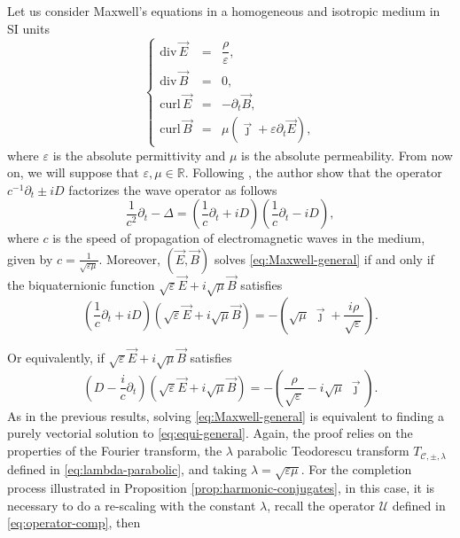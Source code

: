 \documentclass[12pt]{article}
\def\div{\mbox{div}\,}
\def\curl{\mbox{curl}\,}
\let\epsilon\varepsilon
\begin{document}
Let us consider Maxwell's equations in a homogeneous and isotropic medium in SI units
\begin{equation}\label{eq:Maxwell-general}
    \left\{
        \begin{array}{ccc}
            \div{\vec E}&=&\dfrac{\rho}{\epsilon},\\
            \div{\vec B}&=&0,\\
            \curl{\vec E}&=&-\partial_t \vec B,\\
            \curl{\vec B}&=&\mu\left(\vec\jmath +\epsilon\partial_t\vec E\right),
        \end{array}
    \right. 
\end{equation}
where $\epsilon$ is the absolute permittivity and $\mu$ is the absolute permeability. From now on, 
we will suppose that $\epsilon, \mu\in \mathbb{R}$. Following \cite[Section~3.1.1]{kravchenko2003applied}, the author show that 
the operator $c^{-1}\partial_t\pm iD$ factorizes the wave operator as follows
\begin{equation*}
 \frac{1}{c^2}\partial_t-\Delta=\left(\frac{1}{c}\partial_t+iD\right)\left(\frac{1}{c}\partial_t-iD\right),
\end{equation*}
where $c$ is the speed of propagation of electromagnetic waves in the medium, given by $c=\frac{1}{\sqrt{\epsilon\mu}}$. Moreover, $(\vec E, \vec B)$ solves \eqref{eq:Maxwell-general} if and only if the biquaternionic function $\sqrt{\epsilon}\vec{E}+i\sqrt{\mu}\vec B$ satisfies
\begin{equation*}
    \left(\frac{1}{c}\partial_t+iD\right)(\sqrt{\epsilon}\vec{E}+i\sqrt{\mu}\vec B)=-\left(\sqrt{\mu}\;\vec\jmath+\frac{i\rho}{\sqrt{\epsilon}}\right).
\end{equation*}

Or equivalently, if $\sqrt{\epsilon}\vec{E}+i\sqrt{\mu}\vec B$ satisfies
\begin{equation}\label{eq:equi-general}
    \left(D-\frac{i}{c}\partial_t\right)\left(\sqrt{\epsilon}\vec{E}+i\sqrt{\mu}\vec B\right)=-\left(\frac{\rho}{\sqrt{\epsilon}}-i\sqrt{\mu}\;\vec\jmath\right).
\end{equation}
As in the previous results, solving \eqref{eq:Maxwell-general} is equivalent to finding a purely vectorial solution to \eqref{eq:equi-general}. Again, the proof relies on the properties of the Fourier transform, the $\lambda$ parabolic Teodorescu transform $T_{\mathscr{C},\pm,\lambda}$ defined in \eqref{eq:lambda-parabolic}, and taking $\lambda=\sqrt{\epsilon\mu}$. For the completion process illustrated in Proposition \ref{prop:harmonic-conjugates}, in this case, it is necessary to do a re-scaling with the constant $\lambda$, recall the operator $\mathscr{U}$ defined in \eqref{eq:operator-comp}, then
\end{document}
